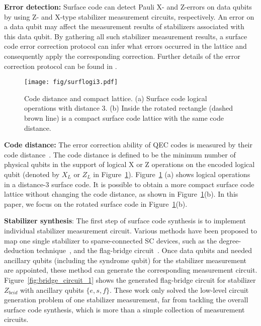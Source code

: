 \textbf{Error detection:} Surface code can detect Pauli X- and Z-errors on data qubits by using Z- and X-type stabilizer measurement circuits, respectively. 
An error on a data qubit may affect the measurement results of stabilizers associated with this data qubit.
By gathering all such stabilizer measurement results, a surface code error correction protocol can infer what errors occurred in the lattice and consequently apply the corresponding correction. 
Further details of the error correction protocol
can be found in \cite{fowler2012surface}.


\begin{figure}[ht]
    \hspace{-15pt}
    \centering
    \texttt{[image: fig/surflogi3.pdf]}
    \caption{Code distance and compact lattice. (a)  Surface code logical operations with distance 3. (b) Inside the rotated rectangle (dashed brown line) is a compact surface code lattice with the same code distance.}
    \label{fig:surf_logi}
\end{figure}

\textbf{Code distance:} The error correction ability of QEC codes is measured by their code distance~\cite{knill2000theory,calderbank1996good}. The code distance is defined to be the minimum number of physical qubits in the support of logical X or Z operations on the encoded logical qubit
(denoted by $X_L$ or $Z_L$ in Figure~\ref{fig:surf_logi}). 
Figure~\ref{fig:surf_logi} (a) shows logical operations in a distance-3 surface code. It is possible to obtain a more compact surface code lattice without changing the code distance, as shown in Figure~\ref{fig:surf_logi}(b). In this paper, we focus on the rotated surface code in Figure~\ref{fig:surf_logi}(b).

\textbf{Stabilizer synthesis}: The first step of surface code synthesis is to implement individual stabilizer measurement circuit. Various methods have been proposed to map one single stabilizer to sparse-connected SC devices, such as the degree-deduction technique~\cite{Chamberland2020TopologicalAS}, and the flag-bridge circuit~\cite{Lao2020FaulttolerantQE, Chao2019FlagFE, Chamberland2017FLAGFE, Chamberland2019TriangularCC}. Once data qubits and needed ancillary qubits (including the syndrome qubit) for the stabilizer measurement are appointed, these method can generate the corresponding  measurement circuit.
Figure~\ref{fig:bridge_circuit_1} 
%
shows the generated flag-bridge circuit for stabilizer $Z_{bcid}$ with ancillary qubits $\{ e,s,f \}$.
These work only solved the low-level circuit generation problem of one stabilizer measurement, far from tackling the overall surface code synthesis, which is more than a simple collection of measurement circuits. %

